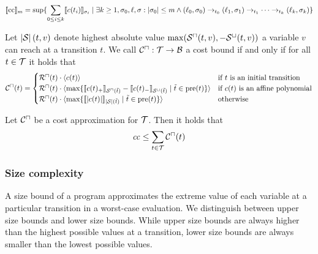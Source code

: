 \begin{definition}
\[ \llbracket \text{cc} \rrbracket_{m} = \sup \lbrace  \sum_{0 \leq i \leq k} \llbracket c(t_i) \rrbracket_{\sigma_i} \mid \exists k \geq 1, \sigma_0, \ell, \sigma: \left|\sigma_0\right| \leq m \wedge
  (\ell_0, \sigma_0) \rightarrow_{t_0} (\ell_1, \sigma_1) \rightarrow_{t_1} \dots \rightarrow_{t_k} (\ell_k, \sigma_k)  \rbrace \]
\end{definition}

\begin{definition}
  Let $\left|\mathcal{S}\right|(t, v)$ denote highest absolute value $\max({\mathcal{S}^\sqcap}(t, v), -{\mathcal{S}^\sqcup}(t, v))$ a variable $v$ can reach at a transition $t$.
  We call ${\mathcal{C}^\sqcap}: \mathcal{T} \rightarrow \mathcal{B}$ a cost bound if and only if for all $t \in \mathcal{T}$ it holds that
  \[ {\mathcal{C}^\sqcap}(t) =
  \begin{cases}
    {\mathcal{R}^\sqcap}(t) \cdot \langle c(t)\rangle & \text{if } t \text{ is an initial transition} \\
    {\mathcal{R}^\sqcap}(t) \cdot \langle\max \lbrace \llbracket c(t)_+ \rrbracket_{{\mathcal{S}^\sqcap}(\tilde{t})} - \llbracket c(t)_- \rrbracket_{{\mathcal{S}^\sqcup}(\tilde{t})} \mid \tilde{t} \in \text{pre}(t) \rbrace\rangle & \text{if } c(t) \text{ is an affine polynomial} \\
    {\mathcal{R}^\sqcap}(t) \cdot \langle\max \lbrace \llbracket \left|c(t)\right| \rrbracket_{\left|\mathcal{S}\right|(\tilde{t})} \mid \tilde{t} \in \text{pre}(t) \rbrace\rangle & \text{otherwise} \\
  \end{cases}
  \]
\end{definition}

\begin{theorem}
	Let ${\mathcal{C}^\sqcap}$ be a cost approximation for $\mathcal{T}$.
	Then it holds that 
	\[ \mathit{cc} \leq \sum_{t \in \mathcal{T}} {\mathcal{C}^\sqcap}(t) \]
\end{theorem}

\subsubsection{Size complexity}

A size bound of a program approximates the extreme value of each variable at a particular transition in a worst-case evaluation.
We distinguish between upper size bounds and lower size bounds.
While upper size bounds are always higher than the highest possible values at a transition, lower size bounds are always smaller than the lowest possible values.

